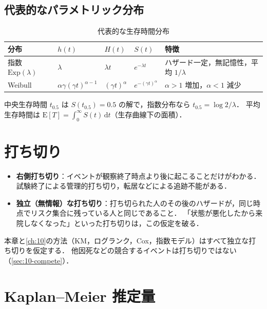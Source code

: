 \documentclass[a4paper,11pt,openany]{ltjsbook}
\newcommand{\tagbox}[2]{\tcbox[on line,boxsep=0.5pt,left=2pt,right=2pt,top=0.5pt,bottom=0.5pt,
  colframe=#1,colback=#1!10,boxrule=0.4pt,arc=1pt]{\scriptsize\bfseries\textcolor{#1}{#2}}}
\newcommand{\Hissu}{\tagbox{bkred}{必須}}
\newcommand{\Hinshutsu}{\tagbox{bkorange}{頻出}}
\newcommand{\E}{\mathrm{E}}
\newcommand{\dd}{\mathrm{d}}
\newcommand{\Ex}{\mathrm{Exp}}
\begin{document}
\subsection{代表的なパラメトリック分布}\label{subsec:09-param}
\begin{table}[htbp]
\centering\small
\caption{代表的な生存時間分布}\label{tab:09-dist}
\begin{tabular}{@{}lllll@{}}
\toprule
分布 & $h(t)$ & $H(t)$ & $S(t)$ & 特徴\\
\midrule
指数 $\Ex(\lambda)$ & $\lambda$ & $\lambda t$ & $e^{-\lambda t}$ & ハザード一定，無記憶性，平均 $1/\lambda$\\
Weibull & $\alpha\gamma(\gamma t)^{\alpha-1}$ & $(\gamma t)^{\alpha}$ & $e^{-(\gamma t)^\alpha}$ & $\alpha>1$ 増加，$\alpha<1$ 減少\\
\bottomrule
\end{tabular}
\end{table}
中央生存時間 $t_{0.5}$ は $S(t_{0.5})=0.5$ の解で，指数分布なら $t_{0.5}=\log2/\lambda$．
平均生存時間は $\E[T]=\int_0^\infty S(t)\,\dd t$（生存曲線下の面積）．

\section{打ち切り}\label{sec:09-censor}
\begin{itemize}
\item \textbf{右側打ち切り}：イベントが観察終了時点より後に起こることだけがわかる．試験終了による管理的打ち切り，転居などによる追跡不能がある．
\item \textbf{独立（無情報）な打ち切り}：打ち切られた人のその後のハザードが，同じ時点でリスク集合に残っている人と同じであること．
      「状態が悪化したから来院しなくなった」といった打ち切りは，この仮定を破る．
\end{itemize}
本章と\cref{ch:10}の方法（KM，ログランク，Cox，指数モデル）はすべて独立な打ち切りを仮定する．
他因死などの競合するイベントは打ち切りではない（\cref{sec:10-compete}）．

\section{Kaplan--Meier 推定量}\label{sec:09-km}
\Hissu\Hinshutsu
\end{document}
